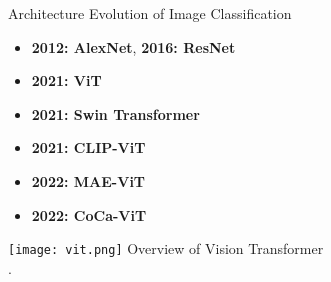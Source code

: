 \begin{refsection}
  \begin{frame}{Architecture Evolution of Image Classification}
    \begin{minipage}{0.48\linewidth}
      {\small
      \begin{itemize}
        \item \textbf{2012: AlexNet}, \textbf{2016: ResNet}
        \item \textbf{2021: ViT} \\
        \item \textbf{2021: Swin Transformer} \\
        \parencite{liuSwinTransformerHierarchical2021}
        \parencite{dosovitskiyImageWorth16x162020}
        \item \textbf{2021: CLIP-ViT} \\
        \parencite{radfordLearningTransferableVisual2021}
        \item \textbf{2022: MAE-ViT} \\
        \parencite{heMaskedAutoencodersAre2022}
        \item \textbf{2022: CoCa-ViT} \\
        \parencite{yuCoCaContrastiveCaptioners2022}
      \end{itemize}
      }
    \end{minipage}%
    \hfill
    \begin{minipage}{0.48\linewidth}
      \centering
      \texttt{[image: vit.png]}
      \scriptsize Overview of Vision Transformer\\\parencite{dosovitskiyImageWorth16x162020}.
    \end{minipage}
    \bottomleftrefs
  \end{frame}
\end{refsection}


